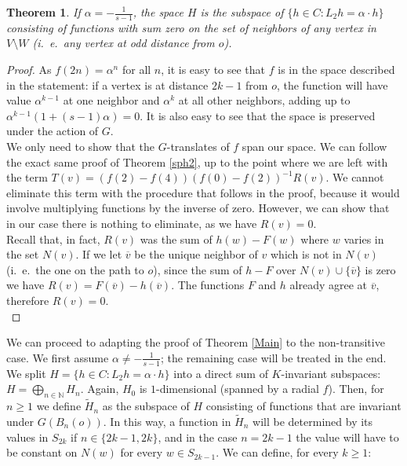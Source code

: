 \documentclass{article}
\theoremstyle{definition}
\theoremstyle{remark}
\theoremstyle{plain}
\newtheorem{thm}[dfn]{Theorem}
\begin{document}
\begin{thm}
If $\alpha=-\frac{1}{s-1}$, the space $H$ is the subspace of $\{h\in C: L_2 h=\alpha\cdot h\}$ consisting of functions with sum zero on the set of neighbors of any vertex in $V\setminus W$ (i.~e.~any vertex at odd distance from $o$).
\end{thm}

\begin{proof}
As $f(2n)=\alpha^n$ for all $n$, it is easy to see that $f$ is in the space described in the statement: if a vertex is at distance $2k-1$ from $o$, the function will have value $\alpha^{k-1}$ at one neighbor and $\alpha^k$ at all other neighbors, adding up to $\alpha^{k-1}(1+(s-1)\alpha)=0$. It is also easy to see that the space is preserved under the action of $G$. \\

We only need to show that the $G$-translates of $f$ span our space. We can follow the exact same proof of Theorem \ref{sph2}, up to the point where we are left with the term $T(v)=(f(2)-f(4))(f(0)-f(2))^{-1}R(v)$. We cannot eliminate this term with the procedure that follows in the proof, because it would involve multiplying functions by the inverse of zero. However, we can show that in our case there is nothing to eliminate, as we have $R(v)=0$. \\

Recall that, in fact, $R(v)$ was the sum of $h(w)-F(w)$ where $w$ varies in the set $N(v)$. If we let $\overline{v}$ be the unique neighbor of $v$ which is not in $N(v)$ (i.~e.~the one on the path to $o$), since the sum of $h-F$ over $N(v)\cup\{\overline{v}\}$ is zero we have $R(v)=F(\overline{v})-h(\overline{v})$. The functions $F$ and $h$ already agree at $\overline{v}$, therefore $R(v)=0$. \\
\end{proof}

We can proceed to adapting the proof of Theorem \ref{Main} to the non-transitive case. We first assume $\alpha\neq -\frac{1}{s-1}$; the remaining case will be treated in the end. \\

We split $H=\{h\in C: L_2 h=\alpha\cdot h\}$ into a direct sum of $K$-invariant subspaces: $H=\bigoplus_{n\in\mathbb{N}}{H_{n}}$. Again, $H_0$ is $1$-dimensional (spanned by a radial $f$). Then, for $n\geq 1$ we define $\widetilde{H}_n$ as the subspace of $H$ consisting of functions that are invariant under $G(B_n(o))$. In this way, a function in $\widetilde{H}_n$ will be determined by its values in $S_{2k}$ if $n\in\{2k-1,2k\}$, and in the case $n=2k-1$ the value will have to be constant on $N(w)$ for every $w\in S_{2k-1}$. We can define, for every $k\geq 1$:
\end{document}
